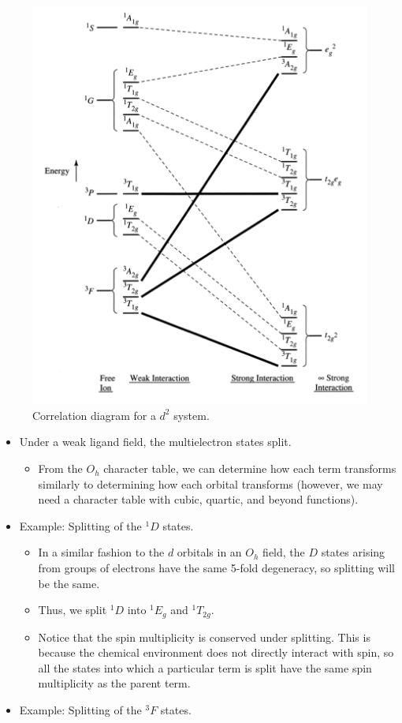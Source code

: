 \documentclass[../notes.tex]{subfiles}
\begin{document}
\begin{itemize}
    \begin{figure}[h!]
        \centering
        \includegraphics[width=0.45\linewidth]{../ExtFiles/correlationDiagram-d2.png}
        \caption{Correlation diagram for a $d^2$ system.}
        \label{fig:correlationDiagram-d2}
    \end{figure}
    \begin{itemize}
        \item Under a weak ligand field, the multielectron states split.
        \begin{itemize}
            \item From the $O_h$ character table, we can determine how each term transforms similarly to determining how each orbital transforms (however, we may need a character table with cubic, quartic, and beyond functions).
        \end{itemize}
        \item Example: Splitting of the ${}^1D$ states.
        \begin{itemize}
            \item In a similar fashion to the $d$ orbitals in an $O_h$ field, the $D$ states arising from groups of electrons have the same 5-fold degeneracy, so splitting will be the same.
            \item Thus, we split ${}^1D$ into ${}^1E_g$ and ${}^1T_{2g}$.
            \item Notice that the spin multiplicity is conserved under splitting. This is because the chemical environment does not directly interact with spin, so all the states into which a particular term is split have the same spin multiplicity as the parent term.
        \end{itemize}
        \item Example: Splitting of the ${}^3F$ states.
        \begin{itemize}

\end{itemize}
\end{itemize}
\end{itemize}
\end{document}
